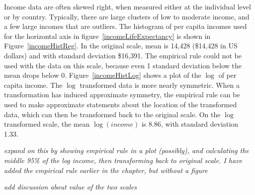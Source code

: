 \begin{doublespace}
Income data are often skewed right, when measured either at the individual level or by country.  Typically, there are large clusters of low to moderate income, and a few large incomes that are outliers. The histogram of per capita incomes used for the horizontal axis in figure~\ref{incomeLifeExpectancy} is shown in Figure~\ref{incomeHistReg}. In the original scale, mean  is 14,428 (\$14,428 in US dollars) and with standard deviation \$16,391.  The empirical rule could not be used with the data on this scale, because even 1 standard deviation below the mean drops below 0. Figure~\ref{incomeHistLog} shows a plot of the $\log$ of per capita income. The $\log$ transformed data is more nearly symmetric. When a transformation has induced approximate symmetry, the empirical rule can be used to make approximate statements about the location of the transformed data, which can then be transformed back to the original scale.  On the $\log$ transformed scale, the mean $\log(income)$ is 8.86, with standard deviation 1.33.

\textit{expand on this by showing empirical rule in a plot (possibly), and calculating the middle 95\% of the log income, then transforming back to original scale.  I have added the empirical rule earlier in the chapter, but without a figure}

\textit{add discussion about value of the two scales}




\end{doublespace}
